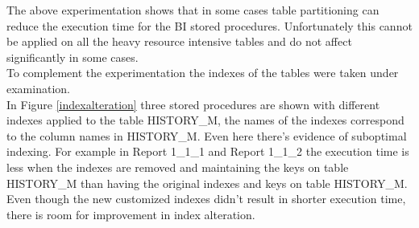 \documentclass{cslthse-msc}
\begin{document}
\noindent The above experimentation shows that in some cases table partitioning can reduce the execution time for the BI stored procedures. Unfortunately this cannot be applied on all the heavy resource intensive tables and do not affect significantly in some cases.\\ To complement the experimentation the indexes of the tables were taken under examination.\\ In Figure \ref{indexalteration} three stored procedures are shown with different indexes applied to the table HISTORY\_M, the names of the indexes correspond to the column names in HISTORY\_M. Even here there's evidence of suboptimal indexing. For example in Report 1\_1\_1 and Report 1\_1\_2 the execution time is less when the indexes are removed and maintaining the keys on table HISTORY\_M than having the original indexes and keys on table HISTORY\_M. Even though the new customized indexes didn't result in shorter execution time, there is room for improvement in index alteration.   
\end{document}
